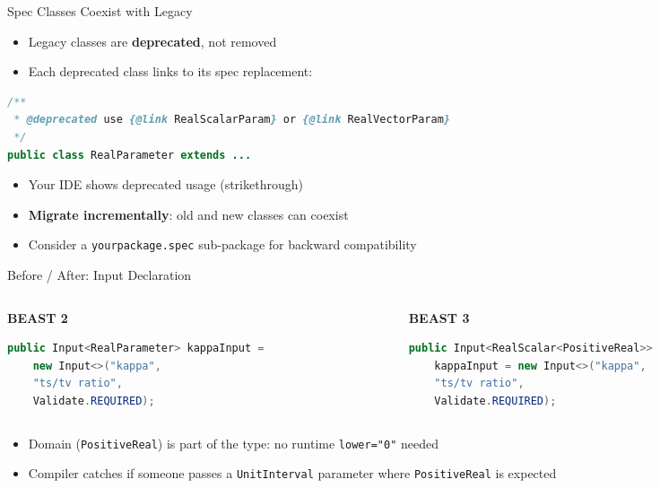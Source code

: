 \documentclass[aspectratio=169,11pt]{beamer}
\newcommand{\code}[1]{\texttt{#1}}
\begin{document}
\begin{frame}[fragile]{Spec Classes Coexist with Legacy}
\begin{itemize}
\item Legacy classes are \textbf{deprecated}, not removed
\item Each deprecated class links to its spec replacement:
\end{itemize}

\begin{lstlisting}[language=Java]
/**
 * @deprecated use {@link RealScalarParam} or {@link RealVectorParam}
 */
public class RealParameter extends ...
\end{lstlisting}

\begin{itemize}
\item Your IDE shows deprecated usage (strikethrough)
\item \textbf{Migrate incrementally}: old and new classes can coexist
\item Consider a \code{yourpackage.spec} sub-package for backward compatibility
\end{itemize}
\end{frame}

\begin{frame}[fragile]{Before / After: Input Declaration}
\begin{columns}[T]
\begin{column}{0.48\textwidth}
\textbf{BEAST 2}
\begin{lstlisting}[language=Java]
public Input<RealParameter> kappaInput =
    new Input<>("kappa",
    "ts/tv ratio",
    Validate.REQUIRED);
\end{lstlisting}
\end{column}
\begin{column}{0.48\textwidth}
\textbf{BEAST 3}
\begin{lstlisting}[language=Java]
public Input<RealScalar<PositiveReal>>
    kappaInput = new Input<>("kappa",
    "ts/tv ratio",
    Validate.REQUIRED);
\end{lstlisting}
\end{column}
\end{columns}

\vspace{1em}
\begin{itemize}
\item Domain (\code{PositiveReal}) is part of the type: no runtime \code{lower="0"} needed
\item Compiler catches if someone passes a \code{UnitInterval} parameter where \code{PositiveReal} is expected
\end{itemize}
\end{frame}
\end{document}
